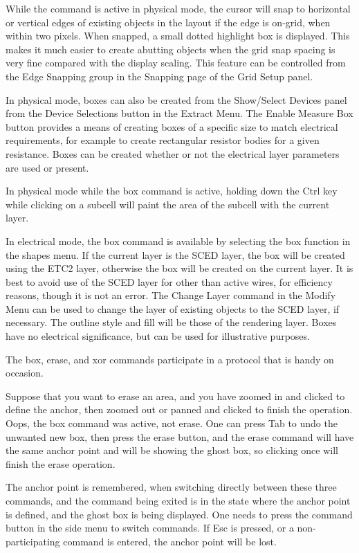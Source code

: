 While the command is active in physical mode, the cursor will snap to
horizontal or vertical edges of existing objects in the layout if the
edge is on-grid, when within two pixels.  When snapped, a small dotted
highlight box is displayed.  This makes it much easier to create
abutting objects when the grid snap spacing is very fine compared with
the display scaling.  This feature can be controlled from the {\cb
Edge Snapping} group in the {\cb Snapping} page of the {\cb Grid
Setup} panel.

In physical mode, boxes can also be created from the {\cb Show/Select
Devices} panel from the {\cb Device Selections} button in the {\cb
Extract Menu}.  The {\cb Enable Measure Box} button provides a means
of creating boxes of a specific size to match electrical requirements,
for example to create rectangular resistor bodies for a given
resistance.  Boxes can be created whether or not the electrical layer
parameters are used or present.

In physical mode while the {\cb box} command is active, holding down
the {\kb Ctrl} key while clicking on a subcell will paint the area of
the subcell with the current layer.

In electrical mode, the box command is available by selecting the {\cb
box} function in the {\cb shapes} menu.  If the current layer is the
SCED layer, the box will be created using the ETC2 layer, otherwise
the box will be created on the current layer.  It is best to avoid use
of the SCED layer for other than active wires, for efficiency reasons,
though it is not an error.  The {\cb Change Layer} command in the {\cb
Modify Menu} can be used to change the layer of existing objects to
the SCED layer, if necessary.  The outline style and fill will be
those of the rendering layer.  Boxes have no electrical significance,
but can be used for illustrative purposes.

The {\cb box}, {\cb erase}, and {\cb xor} commands participate in a
protocol that is handy on occasion.

Suppose that you want to erase an area, and you have zoomed in and
clicked to define the anchor, then zoomed out or panned and clicked to
finish the operation.  Oops, the {\cb box} command was active, not
{\cb erase}.  One can press {\kb Tab} to undo the unwanted new box,
then press the {\cb erase} button, and the {\cb erase} command will
have the same anchor point and will be showing the ghost box, so
clicking once will finish the erase operation.

The anchor point is remembered, when switching directly between these
three commands, and the command being exited is in the state where the
anchor point is defined, and the ghost box is being displayed.  One
needs to press the command button in the side menu to switch commands. 
If {\kb Esc} is pressed, or a non-participating command is entered,
the anchor point will be lost.


